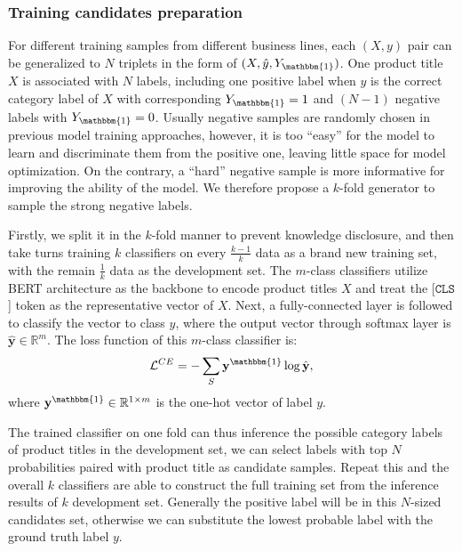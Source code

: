 \subsubsection{Training candidates preparation}
\label{sec:prepare}
For different training samples from different business lines, each $(X, y)$ pair can be generalized to $N$ triplets in the form of $(X, \hat{y}, Y_{\mathbbm{1}})$. One product title $X$ is associated with $N$ labels, including one positive label when $\hat{y}$ is the correct category label of $X$ 
with corresponding $Y_{\mathbbm{1}}=1$ and $(N-1)$ negative labels with $Y_{\mathbbm{1}}=0$. Usually negative samples are randomly chosen in previous model training approaches, however, it is too ``easy'' for the model to learn and discriminate them from the positive one, leaving little space for model optimization. On the contrary, a ``hard'' negative sample is more informative for improving the ability of the model. We therefore propose a $k$-fold generator to sample the strong negative labels.

Firstly, 
we split it in the $k$-fold manner to prevent knowledge disclosure, and then take turns training $k$ classifiers on every $\frac{k-1}{k}$ data as a brand new training set, with the remain $\frac{1}{k}$ data as the development set. The $m$-class classifiers utilize BERT architecture as the backbone to encode product titles $X$ 
and treat the [$\mathtt{CLS}$] token as the representative vector of $X$. Next, a fully-connected layer is followed to classify the vector to class $y$, where the output vector through softmax layer is $\hat{\mathbf{y}}\in \mathbb{R}^{m}$. The loss function of this $m$-class classifier is:
\begin{equation}
    \mathcal{L}^{CE}=-\sum_{S} \mathbf{y}^{\mathbbm{1}} \log \hat{\mathbf{y}},
\end{equation}
where $\mathbf{y}^{\mathbbm{1}}\in \mathbb{R}^{1\times m}$ is the one-hot vector of label $y$.

The trained classifier on one fold can thus inference the possible category labels of product titles in the development set, we can select labels with top $N$ probabilities paired with product title as candidate samples. Repeat this and the overall $k$ classifiers are able to construct the full training set from the inference results of $k$ development set. Generally the positive label will be in this $N$-sized candidates set, otherwise we can substitute the lowest probable label with the ground truth label $y$.

